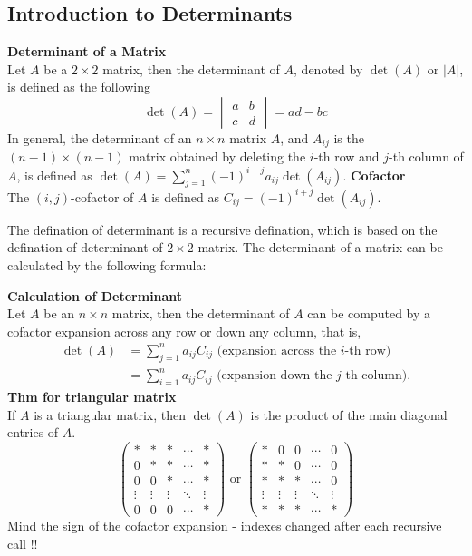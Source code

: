 \documentclass[10pt, a4paper]{article}
\begin{document}
\subsection{Introduction to Determinants}
\begin{definition}
    \textbf{Determinant of a Matrix}\\
    Let $A$ be a $2\times 2$ matrix, then the determinant of $A$, denoted by $\det(A)$ or $|A|$, is defined as the following $$\det(A) = \begin{vmatrix} a & b \\ c & d \end{vmatrix} = ad - bc$$
    In general, the determinant of an $n\times n$ matrix $A$, and $A_{ij}$ is the $(n-1)\times (n-1)$ matrix obtained by deleting the $i$-th row and $j$-th column of $A$, is defined as $\det(A) = \sum_{j=1}^n (-1)^{i+j}a_{ij}\det(A_{ij}).$
    \textbf{Cofactor}\\
    The $(i,j)$-cofactor of $A$ is defined as $C_{ij} = (-1)^{i+j}\det(A_{ij})$.\\
\end{definition}
The defination of determinant is a recursive defination, which is based on the defination of determinant of $2\times 2$ matrix. The determinant of a matrix can be calculated by the following formula:
\begin{proposition}
    \textbf{Calculation of Determinant}\\
    Let $A$ be an $n\times n$ matrix, then the determinant of $A$ can be computed by a cofactor expansion across any row or down any column, that is, 
    \begin{align*}
        \det(A) & = \sum_{j=1}^n a_{ij}C_{ij} \text{ (expansion across the $i$-th row)} \\
                & = \sum_{i=1}^n a_{ij}C_{ij} \text{ (expansion down the $j$-th column)}.
    \end{align*}
    \textbf{Thm for triangular matrix}\\
    If $A$ is a triangular matrix, then $\det(A)$ is the product of the main diagonal entries of $A$.\[
        \begin{pmatrix}
            * & * & * &  \cdots & * \\
            0 & * & * & \cdots & * \\
            0 & 0 & * & \cdots & * \\
            \vdots & \vdots & \vdots & \ddots & \vdots \\
            0 & 0 & 0 & \cdots & *
        \end{pmatrix}
        \text{ or }
        \begin{pmatrix}
            * & 0 & 0 &  \cdots & 0 \\
            * & * & 0 & \cdots & 0 \\
            * & * & * & \cdots & 0 \\
            \vdots & \vdots & \vdots & \ddots & \vdots \\
            * & * & * & \cdots & *
        \end{pmatrix}
    \]
     Mind the sign of the cofactor expansion - indexes changed after each recursive call !!
\end{proposition}
\end{document}
